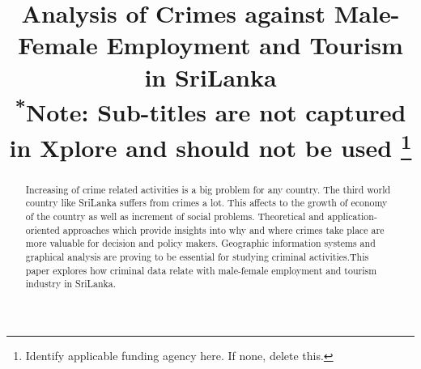 \documentclass[conference]{IEEEtran}
\begin{document}
\title{Analysis of Crimes against Male-Female Employment and Tourism in SriLanka\\
{\footnotesize \textsuperscript{*}Note: Sub-titles are not captured in Xplore and
should not be used}
\thanks{Identify applicable funding agency here. If none, delete this.}
}

\author{
\and
{}
\and
{}
\and
{}
}

\maketitle

\begin{abstract}
Increasing of crime related activities is a big problem for any country.
The third world country like SriLanka suffers from crimes a lot. This affects 
to the growth of economy of the country as well as increment of social problems.
Theoretical and application-oriented approaches which provide insights into why and where crimes take place are more valuable for decision and policy makers.
Geographic information systems and graphical analysis are proving to be essential for studying criminal activities.This paper explores how criminal data relate with male-female employment and tourism industry in SriLanka.
\end{abstract}
\end{document}
